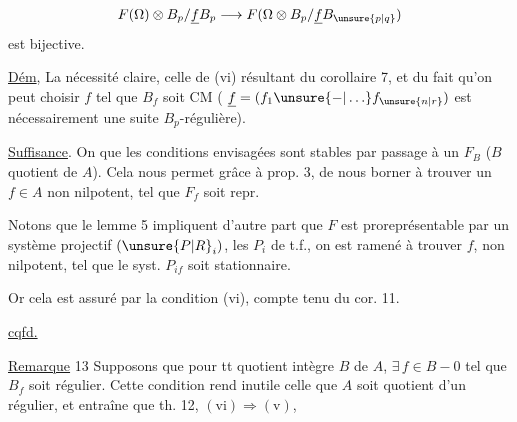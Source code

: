 \[
 F(\Omega)\otimes B_p/\underline f B_p\longrightarrow F(\Omega\otimes B_p/\underline f B_{\unsure{p|q}})
\]
est bijective.

\uline{Dém}, La nécessité claire, celle de (vi) résultant du  corollaire 7, et du fait qu'on peut choisir $f$ tel que $B_f$ soit CM ( $\underline f=(f_1\unsure{-|\ldots}f_{\unsure{n|r}})$ est nécessairement une suite  $B_p$-régulière).

\uline{Suffisance}. On  que les conditions envisagées sont stables par passage à un $F_B$ ($B$ quotient de $A$). Cela nous permet   grâce à prop. 3, de nous borner à trouver un $f\in A$ non nilpotent, tel que $F_f$ soit repr.

Notons que le lemme 5  impliquent d'autre part que $F$ est  proreprésentable par un système projectif  $(\unsure{P|R}_i)$, les $P_i$ de t.f., on est ramené à trouver $f$, non nilpotent, tel que le syst. $P_{if}$ soit stationnaire.

Or cela est assuré par la  condition (vi), compte tenu du cor. 11.

\begin{center}\uline{cqfd.}\end{center}

\uline{Remarque} 13 Supposons que pour tt quotient intègre $B$ de $A$, $\exists\,f\in B-0$ tel que $B_f$ soit régulier. Cette condition rend  inutile celle que $A$ soit quotient d'un régulier, et entraîne que  th. 12, $(\mathrm{vi})\Longrightarrow(\mathrm v)$, 
